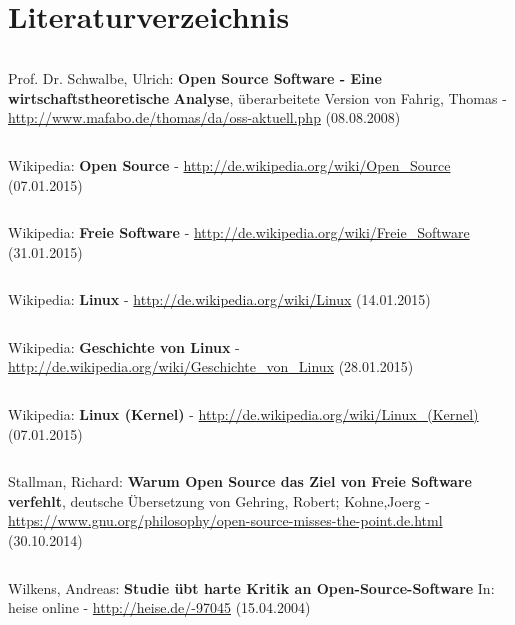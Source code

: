 \documentclass[a4paper,12pt]{article}
\begin{document}
\section{Literaturverzeichnis}
\begin{verbatim}
\end{verbatim}
Prof. Dr. Schwalbe, Ulrich: \textbf{Open Source Software - Eine wirtschaftstheoretische}
\newline
\textbf{Analyse}, überarbeitete Version von Fahrig, Thomas -
\newline
\url{http://www.mafabo.de/thomas/da/oss-aktuell.php} (08.08.2008)
\begin{verbatim}
\end{verbatim}
Wikipedia: \textbf{Open Source} - \url{http://de.wikipedia.org/wiki/Open_Source} (07.01.2015)
\begin{verbatim}
\end{verbatim}
Wikipedia: \textbf{Freie Software} - \url{http://de.wikipedia.org/wiki/Freie_Software} (31.01.2015)
\begin{verbatim}
\end{verbatim}
Wikipedia: \textbf{Linux} - \url{http://de.wikipedia.org/wiki/Linux} (14.01.2015)
\begin{verbatim}
\end{verbatim}
Wikipedia: \textbf{Geschichte von Linux} - \url{http://de.wikipedia.org/wiki/Geschichte_von_Linux} (28.01.2015)
\begin{verbatim}
\end{verbatim}
Wikipedia: \textbf{Linux (Kernel)} - \url{http://de.wikipedia.org/wiki/Linux_(Kernel)} (07.01.2015)
\begin{verbatim}
\end{verbatim}
Stallman, Richard: \textbf{Warum Open Source das Ziel von Freie Software verfehlt}, deutsche Übersetzung von Gehring, Robert; Kohne,Joerg - 
\newline
\url{https://www.gnu.org/philosophy/open-source-misses-the-point.de.html} (30.10.2014)
\begin{verbatim}
\end{verbatim}
Wilkens, Andreas: \textbf{Studie übt harte Kritik an Open-Source-Software} In: heise online - 
\newline
\url{http://heise.de/-97045} (15.04.2004)
\end{document}
